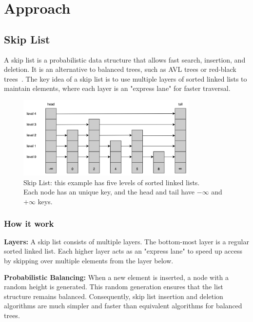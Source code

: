 
\chapter{Approach}\label{chapter:approach}

\section{Skip List}

A skip list is a probabilistic data structure that allows fast search, insertion, and deletion. It is an alternative to balanced trees, such as AVL trees or red-black trees~\parencite{pugh1990skip, pugh1990skip2}. The key idea of a skip list is to use multiple layers of sorted linked lists to maintain elements, where each layer is an "express lane" for faster traversal.

\begin{figure}[h]
    \centering
    \includegraphics[width=0.8\textwidth]{./figures/skiplist.jpg}
    \caption{Skip List: this example has five levels of sorted linked lists. \\
    Each node has an unique key, and the head and tail have $-\infty$ and $+\infty$ keys.}
    \label{fig:skiplist}
\end{figure}

\subsection*{How it work}

\textbf{Layers:} A skip list consists of multiple layers. The bottom-most layer is a regular sorted linked list. Each higher layer acts as an "express lane" to speed up access by skipping over multiple elements from the layer below.

\textbf{Probabilistic Balancing:} When a new element is inserted, a node with a random height is generated. This random generation ensures that the list structure remains balanced. Consequently, skip list insertion and deletion algorithms are much simpler and faster than equivalent algorithms for balanced trees.

